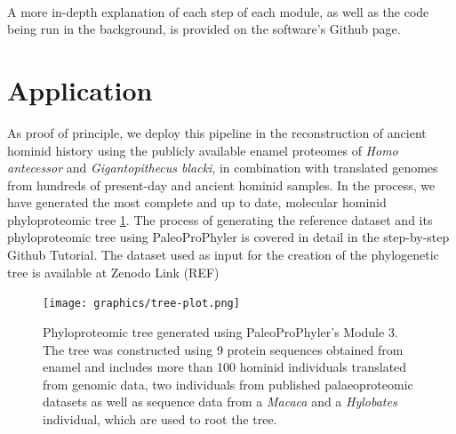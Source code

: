\documentclass[twocolumn,showpacs,%
  nofootinbib,aps,superscriptaddress,%
  eqsecnum,prd,notitlepage,showkeys,10pt]{report}
\begin{document}
\paragraph{}

A more in-depth explanation of each step of each module, as well as the code being run in the background, is provided on the software's Github page.

\section{Application}

As proof of principle, we deploy this pipeline in the reconstruction of ancient hominid history using the publicly available enamel proteomes of \textit{Homo antecessor} and \textit{Gigantopithecus blacki}, in combination with translated genomes from hundreds of present-day and ancient hominid samples. In the process, we have generated the most complete and up to date, molecular hominid phyloproteomic tree \ref{fig:PhyloTree}. The process of generating the reference dataset and its phyloproteomic tree using PaleoProPhyler is covered in detail in the step-by-step Github Tutorial. The dataset used as input for the creation of the phylogenetic tree is available at Zenodo Link (REF)



\begin{figure}[h!]
\centering
\texttt{[image: graphics/tree-plot.png]}
\caption{Phyloproteomic tree generated using PaleoProPhyler's Module 3. The tree was constructed using 9 protein sequences obtained from enamel and includes more than 100 hominid individuals translated from genomic data, two individuals from published palaeoproteomic datasets as well as sequence data from a {\it Macaca} and a {\it Hylobates} individual, which are used to root the tree.}
\label{fig:PhyloTree}
\end{figure}
\end{document}
